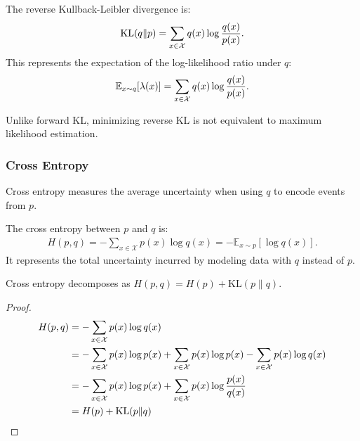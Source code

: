 \begin{definition}
	The \textnormal{\sffamily reverse Kullback-Leibler divergence} is:
	\begin{align}
		\label{eq:reverse-KL}
		\text{KL}(q \| p) = \sum_{x \in \mathcal{X}} q(x) \log{q(x) \over p(x)}.
	\end{align}
	This represents the expectation of the log-likelihood ratio under $q$:
	\begin{align}
		\mathbb{E}_{x \sim q}[\lambda(x)] = \sum_{x \in \mathcal{X}} q(x)\log {q(x) \over p(x)}.
	\end{align}
\end{definition}
Unlike forward KL, minimizing reverse KL is not equivalent to maximum likelihood estimation.

\subsubsection{Cross Entropy}
Cross entropy measures the average uncertainty when using $q$ to encode events from $p$.

\begin{definition}
	The \textnormal{\sffamily cross entropy} between $p$ and $q$ is:
	\begin{align}
		H(p, q) = - \sum_{x \in \mathcal{X}} p(x) \log q(x) = -\mathbb{E}_{x \sim p}\left[\log{q(x)}\right].
	\end{align}
	It represents the total uncertainty incurred by modeling data with $q$ instead of $p$.
\end{definition}

\begin{lemma}
	Cross entropy decomposes as $H(p, q) = H(p) + \text{KL}(p \| q)$.
\end{lemma}
\begin{proof}
	\begin{align}
		H(p, q) & = -\sum_{x \in \mathcal{X}} p(x) \log q(x)                                                                                     \\
		        & = -\sum_{x \in \mathcal{X}} p(x) \log p(x) + \sum_{x \in \mathcal{X}} p(x) \log p(x) - \sum_{x \in \mathcal{X}} p(x) \log q(x) \\
		        & = -\sum_{x \in \mathcal{X}} p(x) \log p(x) + \sum_{x \in \mathcal{X}} p(x) \log {p(x) \over q(x)}                              \\
		        & = H(p) + \text{KL}(p \| q)
	\end{align}
\end{proof}


